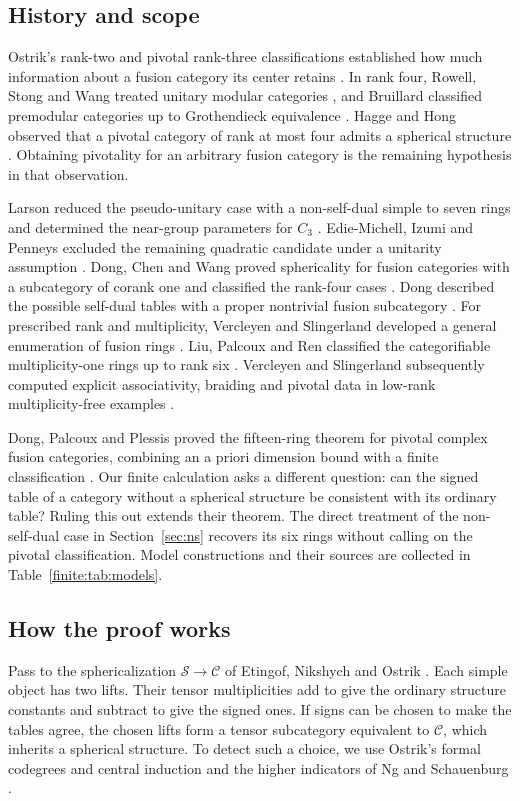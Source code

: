 \documentclass[11pt,a4paper]{article}
\theoremstyle{definition}\newtheorem{definition}[theorem]{Definition}
\theoremstyle{remark}\newtheorem{remark}[theorem]{Remark}
\newcommand{\C}{\mathcal C}
\numberwithin{equation}{section}
\begin{document}
\subsection*{History and scope}
Ostrik's rank-two and pivotal rank-three classifications established how
much information about a fusion category its center retains
\cite{OstrikRankTwo,Ostrik3}. In rank four, Rowell, Stong and Wang treated
unitary modular categories \cite{RSW}, and Bruillard classified premodular
categories up to Grothendieck equivalence \cite{Bruillard}. Hagge and Hong
observed that a pivotal category of rank at most four admits a spherical
structure \cite[Lemma~4]{HaggeHong}. Obtaining pivotality for an
arbitrary fusion category is the remaining hypothesis in that observation.

Larson reduced the pseudo-unitary case with a non-self-dual simple to seven
rings and determined the near-group parameters for $C_3$ \cite{Larson}.
Edie-Michell, Izumi and Penneys excluded the remaining quadratic candidate
under a unitarity assumption \cite{EIP}. Dong, Chen and Wang proved
sphericality for fusion categories with a subcategory of corank one and
classified the rank-four cases \cite{DCW}. Dong described the possible
self-dual tables with a proper nontrivial fusion subcategory \cite{DongFour}.
For prescribed rank and multiplicity, Vercleyen and Slingerland developed
a general enumeration of fusion rings \cite{VS}. Liu, Palcoux and Ren
classified the categorifiable multiplicity-one rings up to rank six
\cite{LPR}. Vercleyen and Slingerland subsequently computed explicit
associativity, braiding and pivotal data in low-rank multiplicity-free
examples \cite{VSData}.

Dong, Palcoux and Plessis proved the fifteen-ring theorem for pivotal
complex fusion categories, combining an a priori dimension bound with
a finite classification \cite{DPP}. Our finite calculation asks a
different question: can the signed table of a category without a
spherical structure be consistent with its ordinary table? Ruling this
out extends their theorem. The direct treatment of the non-self-dual
case in Section~\ref{sec:ns} recovers its six rings without calling on the
pivotal classification. Model constructions and their sources are collected
in Table~\ref{finite:tab:models}.

\subsection*{How the proof works}
Pass to the sphericalization $\mathcal S\to\C$ of
Etingof, Nikshych and Ostrik \cite{ENO}. Each simple object has two lifts.
Their tensor multiplicities add to give the ordinary structure constants
and subtract to give the signed ones. If signs can be chosen to make the
tables agree, the chosen lifts form a tensor subcategory equivalent to
$\C$, which inherits a spherical structure. To detect such a choice,
we use Ostrik's formal codegrees and central induction
\cite{OstrikCodegrees,Ostrik3} and the higher indicators of Ng and
Schauenburg \cite{NS,NSHigher}.
\end{document}
